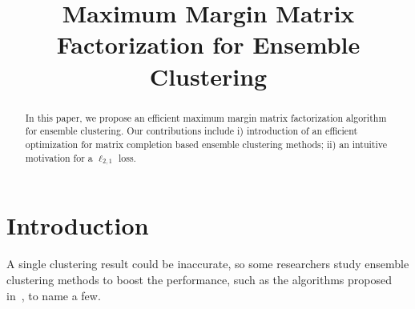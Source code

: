 \documentclass[letterpaper]{article}
\begin{document}
%



\title{Maximum Margin Matrix Factorization for Ensemble Clustering}




\maketitle



\begin{abstract}
In this paper, we propose an efficient maximum margin matrix factorization algorithm for ensemble clustering.
Our contributions include i) introduction of an efficient optimization for matrix completion based ensemble clustering methods; ii) an intuitive motivation for a $\ell_{2,1}$ loss.
\end{abstract}






\section{Introduction}

A single clustering result could be inaccurate, so some researchers study ensemble clustering methods to boost the performance,
such as the algorithms proposed in~\cite{yiicdm2012robust,gaoijcai2016robust}, to name a few.
\end{document}
